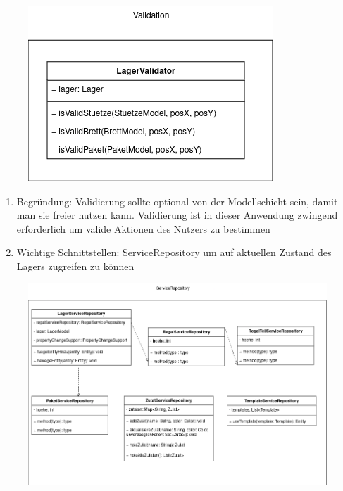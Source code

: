 \begin{figure}[H]
    \includegraphics[width=\linewidth]{images/bausteinsicht/Ebene3_Validation.png}
    \label{fig:Validation}
\end{figure}
\begin{enumerate}
    \item Begründung: Validierung sollte optional von der Modellschicht sein, damit man sie freier nutzen kann. Validierung ist in dieser Anwendung zwingend erforderlich um valide Aktionen des Nutzers zu bestimmen
    \item Wichtige Schnittstellen: ServiceRepository um auf aktuellen Zustand des Lagers zugreifen zu können
\end{enumerate}
\begin{figure}[H]
    \includegraphics[width=\linewidth]{images/bausteinsicht/Ebene3_ServiceRepository.png}
    \label{fig:ServiceRepository}
\end{figure}
